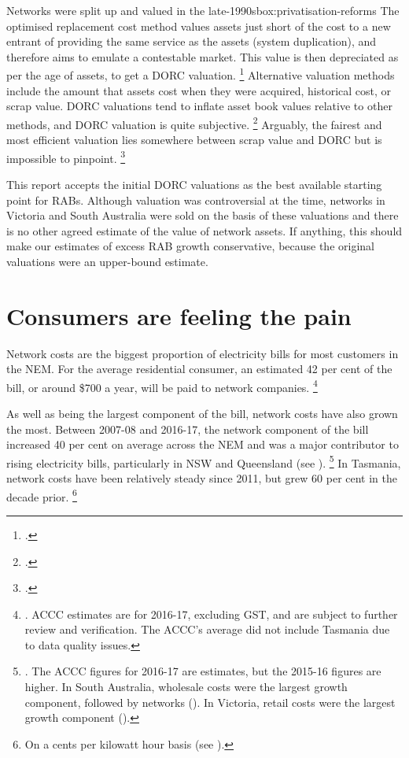 \documentclass[FrontPage]{grattan}
\begin{document}
\begin{bigbox}{Networks were split up and valued in the late-1990s}{box:privatisation-reforms}
The optimised replacement cost method values assets just short of the cost to a new entrant of providing the same service as the assets (system duplication), and therefore aims to emulate a contestable market. This value is then depreciated as per the age of assets, to get a DORC valuation.%
\footcite{Johnstone2003DORC}
Alternative valuation methods include the amount that assets cost when they were acquired, historical cost, or scrap value. DORC valuations tend to inflate asset book values relative to other methods, and DORC valuation is quite subjective.%
\footcites{Johnstone2001DORC}{Johnstone2003DORC}
Arguably, the fairest and most efficient valuation lies somewhere between scrap value and DORC but is impossible to pinpoint.%
\footcite{SAEconomics1998AssetValuation}

This report accepts the initial DORC valuations as the best available starting point for RABs. Although valuation was controversial at the time, networks in Victoria and South Australia were sold on the basis of these valuations and there is no other agreed estimate of the value of network assets. If anything, this should make our estimates of excess RAB growth conservative, because the original valuations were an upper-bound estimate.

\end{bigbox}

\section{Consumers are feeling the pain}\label{sec:consumers-feeling-the-pain}
Network costs are the biggest proportion of electricity bills for most customers in the NEM\@. For the average residential consumer, an estimated 42 per cent of the bill, or around \$700 a year, will be paid to network companies.%
\footnote{\textcite{ACCC2017ElectricityInterimReport}. ACCC estimates are for 2016-17, excluding GST, and are subject to further review and verification. The ACCC's average did not include Tasmania due to data quality issues.}

As well as being the largest component of the bill, network costs have also grown the most. Between 2007-08 and 2016-17, the network component of the bill increased 40 per cent on average across the NEM and was a major contributor to rising electricity bills, particularly in NSW and Queensland (see ).%
\footnote{\textcite{ACCC2017ElectricityInterimReport}. The ACCC figures for 2016-17 are estimates, but the 2015-16 figures are higher. In South Australia, wholesale costs were the largest growth component, followed by networks (\textcite{ACCC2017ElectricityInterimReport}). In Victoria, retail costs were the largest growth component (\textcites{ACCC2017ElectricityInterimReport}{WoodBlowers-2017-Price-shock}).}
In Tasmania, network costs have been relatively steady since 2011, but grew 60 per cent in the decade prior.%
\footnote{On a cents per kilowatt hour basis (see \textcites{Tas2011PriceTrends}{AEMC2013PriceTrends}{AEMC2017PriceTrends}).}
\end{document}
